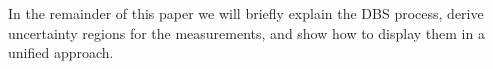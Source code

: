 \documentclass{vgtc}                          %
\begin{document}

In the remainder of this paper we will briefly explain the DBS process, derive uncertainty regions for the measurements, and show how to display them in a unified approach.

%
%
%
%
%
\end{document}
